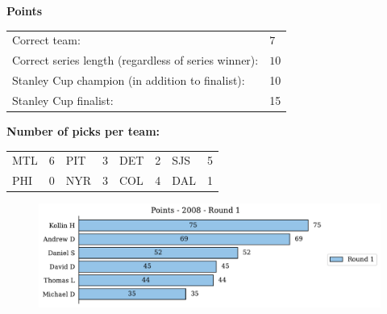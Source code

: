 \documentclass[10pt]{article}
\begin{document}
{\bf Points}\\
\begin{minipage}{12cm}
    \begin{tabular}{l l}
        Correct team:	& $7$\\
        Correct series length (regardless of series winner):	& $10$\\
        Stanley Cup champion (in addition to finalist):	& 10\\
        Stanley Cup finalist:	& 15\\
    \end{tabular}

    \vspace{1cm}
    {\bf Number of picks per team:}\\
    \begin{tabular}{lc | lc | lc | lc }
        MTL & 6 & PIT & 3 & DET & 2 & SJS & 5 \\
        PHI & 0 & NYR & 3 & COL & 4 & DAL & 1 \\
    \end{tabular}
\end{minipage}
\begin{minipage}[t]{13cm}
    \begin{figure}[H]
        \vspace{-2.5cm}
        \includegraphics[width=13cm]{../../figures/2008/Points-2008-Round1.pdf}
    \end{figure}
\end{minipage}
\end{document}
